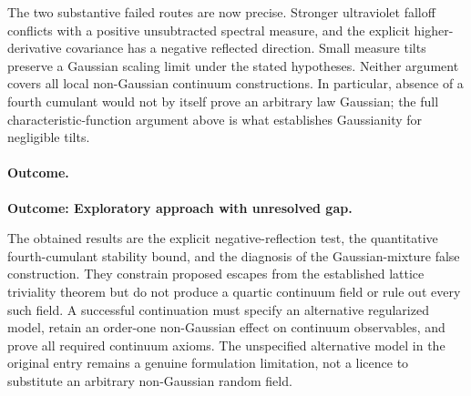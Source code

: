 \documentclass[11pt]{article}
\begin{document}
The two substantive failed routes are now precise. Stronger ultraviolet
falloff conflicts with a positive unsubtracted spectral measure, and the
explicit higher-derivative covariance has a negative reflected direction.
Small measure tilts preserve a Gaussian scaling limit under the stated
hypotheses. Neither argument covers all local non-Gaussian continuum
constructions. In particular, absence of a fourth cumulant would not by
itself prove an arbitrary law Gaussian; the full characteristic-function
argument above is what establishes Gaussianity for negligible tilts.

\paragraph{Outcome.}
\textbf{Outcome: Exploratory approach with unresolved gap.}

The obtained results are the explicit negative-reflection test, the
quantitative fourth-cumulant stability bound, and the diagnosis of the
Gaussian-mixture false construction. They constrain proposed escapes from
the established lattice triviality theorem but do not produce a quartic
continuum field or rule out every such field. A successful continuation
must specify an alternative regularized model, retain an order-one
non-Gaussian effect on continuum observables, and prove all required
continuum axioms. The unspecified alternative model in the original entry
remains a genuine formulation limitation, not a licence to substitute an
arbitrary non-Gaussian random field.
\end{document}
